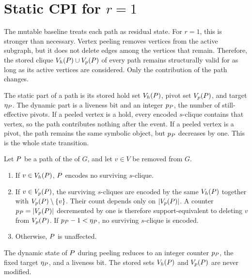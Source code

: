 \section{\texorpdfstring{Static CPI for \(r=1\)}{Static CPI for r=1}}\label{sec:static}

The mutable baseline treats each \cpi{} path as residual state.
%
For \(r=1\), this is stronger than necessary.
%
Vertex peeling removes vertices from the active subgraph, but it does not delete edges among the vertices that remain.
%
Therefore, the stored clique \(\Vh(\TPath)\cup\Vp(\TPath)\) of every path remains structurally valid for as long as its active vertices are considered.
%
Only the contribution of the path changes.

The static part of a path is its stored hold set \(\Vh(\TPath)\), pivot set \(\Vp(\TPath)\), and target \(\eta_{\TPath}\).
%
The dynamic part is a liveness bit and an integer \(p_{\TPath}\), the number of still-effective pivots.
%
If a peeled vertex is a hold, every encoded \(s\)-clique contains that vertex, so the path contributes nothing after the event.
%
If a peeled vertex is a pivot, the path remains the same symbolic object, but \(p_{\TPath}\) decreases by one.
%
This is the whole state transition.

\begin{theorem}\label{thm:vertex-removal}
Let \(\TPath\) be a path of the \cpi{} of \(G\), and let \(v\in V\) be removed from \(G\).
\begin{enumerate}[leftmargin=1.5em,itemsep=1pt,topsep=2pt]
  \item If \(v\in\Vh(\TPath)\), \(\TPath\) encodes no surviving \(s\)-clique.
  \item If \(v\in\Vp(\TPath)\), the surviving \(s\)-cliques are encoded by the same \(\Vh(\TPath)\) together with \(\Vp(\TPath)\setminus\{v\}\).
%
  Their count depends only on \(|\Vp(\TPath)|\).
%
  A counter \(p_{\TPath}=|\Vp(\TPath)|\) decremented by one is therefore support-equivalent to deleting \(v\) from \(\Vp(\TPath)\).
%
  If \(p_{\TPath}-1<\eta_{\TPath}\), no surviving \(s\)-clique is encoded.
  \item Otherwise, \(\TPath\) is unaffected.
\end{enumerate}
The dynamic state of \(\TPath\) during peeling reduces to an integer counter \(p_{\TPath}\), the fixed target \(\eta_{\TPath}\), and a liveness bit.
%
The stored sets \(\Vh(\TPath)\) and \(\Vp(\TPath)\) are never modified.
\end{theorem}

